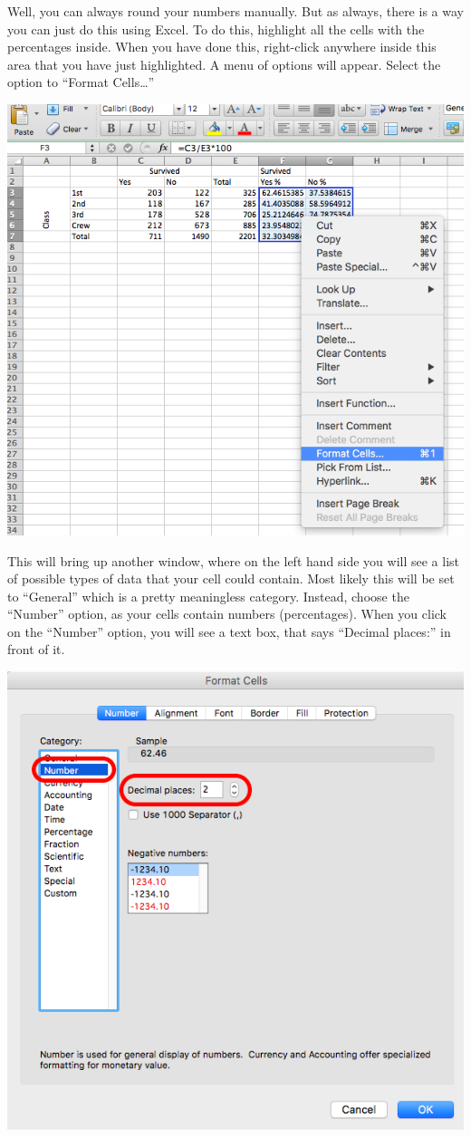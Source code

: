\documentclass[
]{book}
\begin{document}
Well, you can always round your numbers manually. But as always, there is a way you can just do this using Excel. To do this, highlight all the cells with the percentages inside. When you have done this, right-click anywhere inside this area that you have just highlighted. A menu of options will appear. Select the option to ``Format Cells\ldots{}''

\includegraphics{imgs/format_cells.png}

This will bring up another window, where on the left hand side you will see a list of possible types of data that your cell could contain. Most likely this will be set to ``General'' which is a pretty meaningless category. Instead, choose the ``Number'' option, as your cells contain numbers (percentages). When you click on the ``Number'' option, you will see a text box, that says ``Decimal places:'' in front of it.

\includegraphics{imgs/num_dec_set.png}
\end{document}
